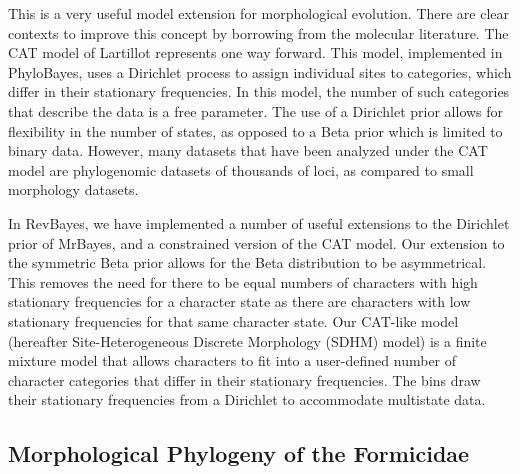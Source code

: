 \documentclass[]{article}
\begin{document}
This is a very useful model extension for morphological evolution.
There are clear contexts to improve this concept by borrowing from the molecular literature.
The CAT model of Lartillot represents one way forward. 
This model, implemented in PhyloBayes, uses a Dirichlet process to assign individual sites to categories, which differ in their stationary frequencies. 
In this model, the number of such categories that describe the data is a free parameter. 
The use of a Dirichlet prior allows for flexibility in the number of states, as opposed to a Beta prior which is limited to binary data.
However, many datasets that have been analyzed under the CAT model are phylogenomic datasets of thousands of loci, as compared to small morphology datasets.\par
In RevBayes, we have implemented a number of useful extensions to the Dirichlet prior of MrBayes, and a constrained version of the CAT model. 
Our extension to the symmetric Beta prior allows for the Beta distribution to be asymmetrical.
This removes the need for there to be equal numbers of characters with high stationary frequencies for a character state as there are characters with low stationary frequencies for that same character state.
Our CAT-like model (hereafter Site-Heterogeneous Discrete Morphology (SDHM) model) is a finite mixture model that allows characters to fit into a user-defined number of character categories that differ in their stationary frequencies. 
The bins draw their stationary frequencies from a Dirichlet to accommodate multistate data. 

\subsection{Morphological Phylogeny of the Formicidae}
\end{document}
